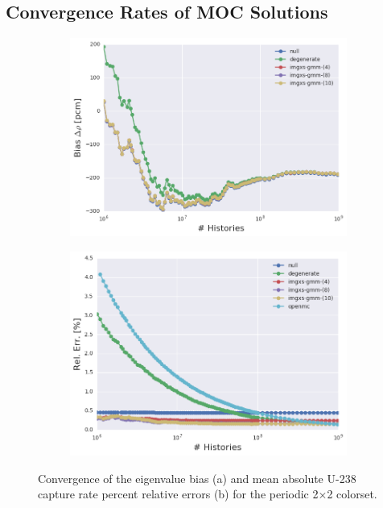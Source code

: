 \documentclass[12pt,twoside]{mitthesis-exec}
\begin{document}
\clearpage

\subsection*{Convergence Rates of MOC Solutions}

\begin{figure}[h!]
\centering
\begin{subfigure}{\textwidth}
  \centering
  \includegraphics[width=0.8\linewidth]{figures/results/convergence/2x2/keff-bias-evo}
  \caption{}
  \label{fig:2x2-eigenvalue-converge}
\end{subfigure}
\begin{subfigure}{\textwidth}
  \centering
  \includegraphics[width=0.8\linewidth]{figures/results/convergence/2x2/mean-capt-err-evo}
  \caption{}
  \label{fig:2x2-capture-converge-mean}
\end{subfigure}
\vspace{2mm}
\caption[Fission rate covergence for the periodic 2$\times$2 colorset]{Convergence of the eigenvalue bias (a) and mean absolute U-238 capture rate percent relative errors (b) for the periodic 2$\times$2 colorset.}
\label{fig:2x2-capture-converge}
\end{figure}
\end{document}
